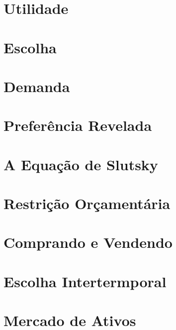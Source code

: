 \documentclass[a4paper,11pt,oneside]{book}
\theoremstyle{definition}
\theoremstyle{break}
\begin{document}
\chapter{Utilidade}

\chapter{Escolha}

\chapter{Demanda}

\chapter{Preferência Revelada}

\chapter{A Equação de Slutsky}

\chapter{Restrição Orçamentária}

\chapter{Comprando e Vendendo}

\chapter{Escolha Intertermporal}

\chapter{Mercado de Ativos}

\end{document}
